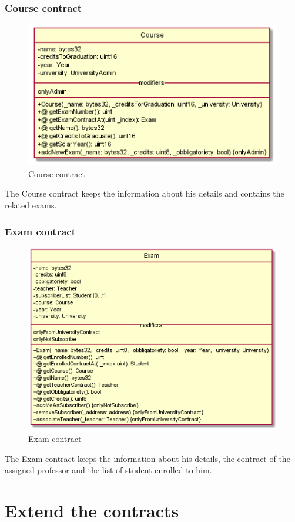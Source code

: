 \documentclass[ManualeSviluppatore.tex]{subfiles}
\begin{document}
\subsubsection{Course contract}
\begin{figure}[H]
\centering
\includegraphics[width=0.7\linewidth]{"diagrammi/solidity/course"}
\caption{Course contract}
\label{fig:Course contract}
\end{figure}
The Course contract keeps the information about his details and contains the related exams. \\

\subsubsection{Exam contract}
\begin{figure}[H]
\centering
\includegraphics[width=0.7\linewidth]{"diagrammi/solidity/exam"}
\caption{Exam contract}
\label{fig:Exam contract}
\end{figure}
The Exam contract keeps the information about his details, the contract of the assigned professor and the list of student enrolled to him. \\

\newpage
\section{Extend the contracts}
\end{document}

